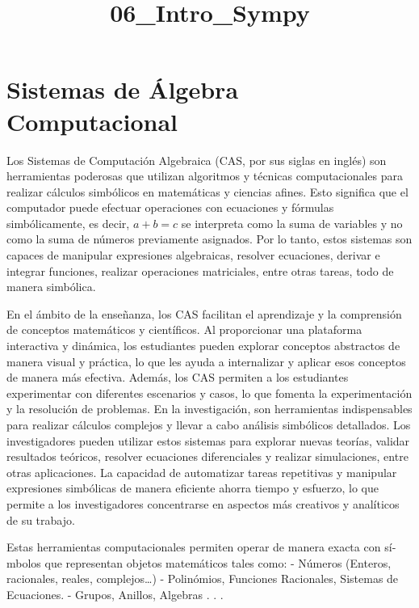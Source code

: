 \documentclass[11pt]{article}
\title{06\_Intro\_Sympy}
\begin{document}
    
    \maketitle
    
    

    
    \hypertarget{sistemas-de-uxe1lgebra-computacional}{%
\section{Sistemas de Álgebra
Computacional}\label{sistemas-de-uxe1lgebra-computacional}}

    Los Sistemas de Computación Algebraica (CAS, por sus siglas en inglés)
son herramientas poderosas que utilizan algoritmos y técnicas
computacionales para realizar cálculos simbólicos en matemáticas y
ciencias afines. Esto significa que el computador puede efectuar
operaciones con ecuaciones y fórmulas simbólicamente, es decir,
\(a+b=c\) se interpreta como la suma de variables y no como la suma de
números previamente asignados. Por lo tanto, estos sistemas son capaces
de manipular expresiones algebraicas, resolver ecuaciones, derivar e
integrar funciones, realizar operaciones matriciales, entre otras
tareas, todo de manera simbólica.

En el ámbito de la enseñanza, los CAS facilitan el aprendizaje y la
comprensión de conceptos matemáticos y científicos. Al proporcionar una
plataforma interactiva y dinámica, los estudiantes pueden explorar
conceptos abstractos de manera visual y práctica, lo que les ayuda a
internalizar y aplicar esos conceptos de manera más efectiva. Además,
los CAS permiten a los estudiantes experimentar con diferentes
escenarios y casos, lo que fomenta la experimentación y la resolución de
problemas. En la investigación, son herramientas indispensables para
realizar cálculos complejos y llevar a cabo análisis simbólicos
detallados. Los investigadores pueden utilizar estos sistemas para
explorar nuevas teorías, validar resultados teóricos, resolver
ecuaciones diferenciales y realizar simulaciones, entre otras
aplicaciones. La capacidad de automatizar tareas repetitivas y manipular
expresiones simbólicas de manera eficiente ahorra tiempo y esfuerzo, lo
que permite a los investigadores concentrarse en aspectos más creativos
y analíticos de su trabajo.

Estas herramientas computacionales permiten operar de manera exacta con
sí­mbolos que representan objetos matemáticos tales como: - Números
(Enteros, racionales, reales, complejos\ldots) - Polinómios, Funciones
Racionales, Sistemas de Ecuaciones. - Grupos, Anillos, Algebras . . .
\end{document}
